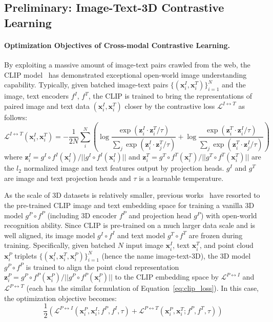 \documentclass{article} \usepackage{iclr2024_conference,times}
\begin{document}
\subsection{Preliminary: Image-Text-3D Contrastive Learning}
\label{subsec:preliminary}
\paragraph{Optimization Objectives of Cross-modal Contrastive Learning.}
By exploiting a massive amount of image-text pairs crawled from the web, the CLIP model~\citep{openai_clip} has demonstrated exceptional open-world image understanding capability.
Typically, given batched image-text pairs $\{(\bm{x}_{i}^{I}, \bm{x}_{i}^{T})\}_{i=1}^{N}$ and the image, text encoders $f^{I}$, $f^{T}$, 
the CLIP is trained to bring the representations of paired image and text data $(\bm{x}_{i}^{I}, \bm{x}_{i}^{T})$ closer by the contrastive loss $\mathcal{L}^{I \leftrightarrow T}$ as follows:
\begin{equation}
\label{eq:clip_loss}
\mathcal{L}^{I \leftrightarrow T}(\bm{x}_{i}^{I},\bm{x}_{i}^{T}) = -\frac{1}{2N} \sum_i^N\left(
\log\frac{\exp(\bm{z}_i^I\cdot \bm{z}_i^T/\tau)}{\sum_j\exp(\bm{z}_i^I\cdot \bm{z}_j^T/\tau)} +
\log\frac{\exp(\bm{z}_i^T\cdot \bm{z}_i^I/\tau)}{\sum_j \exp(\bm{z}_i^T\cdot \bm{z}_j^I/\tau)}\right)
\end{equation}
where $\bm{z}^{I}_i = g^I \circ f^I(\bm{x}_{i}^{I})/||g^I \circ f^I(\bm{x}_{i}^{I})||$ and $\bm{z}^{T}_i = g^T \circ f^T(\bm{x}_{i}^{T})/||g^T \circ f^T(\bm{x}_{i}^{T})||$ are the $l_2$ normalized image and text features output by projection heads. 
$g^I$ and $g^T$ are image and text projection heads and $\tau$ is a learnable temperature.  

As the scale of 3D datasets is relatively smaller, previous works~\citep{ulip, ulip2, openshape, zeng2023clip2} have resorted to the pre-trained CLIP image and text embedding space for training a vanilla 3D model $g^P \circ f^{P}$ (including 3D encoder $f^P$ and projection head $g^P$) with open-world recognition ability. 
Since CLIP is pre-trained on a much larger data scale and is well aligned, its image model $g^I \circ f^{I}$ and text model $g^T \circ f^{T}$ are frozen during training.
Specifically, given batched $N$ input image $\bm{x}_{i}^{I}$, text $\bm{x}_{i}^{T}$, and point cloud $\bm{x}_{i}^{P}$ triplets $\{(\bm{x}_{i}^{I}, \bm{x}_{i}^{T}, \bm{x}_{i}^{P})\}_{i=1}^{N}$ (hence the name image-text-3D), the 3D model $g^P \circ f^{P}$ is trained to align the point cloud representation $\bm{z}^{P}_i = g^P \circ f^P(\bm{x}_{i}^{P})/||g^P \circ f^P(\bm{x}_{i}^{P})||$ to the CLIP embedding space by $\mathcal{L}^{P \leftrightarrow I}$ and $\mathcal{L}^{P \leftrightarrow T}$ (each has the similar formulation of Equation~\ref{eq:clip_loss}).
In this case, the optimization objective becomes:
\begin{equation}
\label{eq:naive_align}
\frac{1}{2}(\mathcal{L}^{P \leftrightarrow I}(\bm{x}_{i}^{P},\bm{x}_{i}^{I};f^{P},f^{I},\tau) + 
\mathcal{L}^{P \leftrightarrow T}(\bm{x}_{i}^{P},\bm{x}_{i}^{T};f^{P},f^{T},\tau))
\end{equation} 
\end{document}
